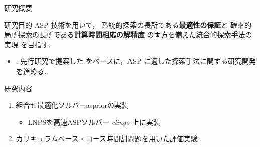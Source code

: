 \documentclass[11pt,dvipdfmx]{beamer}
\begin{document}
\begin{frame}{研究概要}
  \begin{alertblock}{研究目的}\centering
    ASP 技術を用いて，
   系統的探索の長所である\alert{\bf 最適性の保証}と
   確率的局所探索の長所である\alert{\bf 計算時間相応の解精度}
   の両方を備えた統合的探索手法の実現
   を目指す.
  \end{alertblock}

  \begin{itemize}
  \item {}:
    先行研究で提案した%
    をベースに，ASP に適した探索手法に関する研究開発を進める．
  \end{itemize}

  \begin{block}{研究内容}
    \begin{enumerate}
    \item 組合せ最適化ソルバーaspriorの実装
     \begin{itemize}
      \item LNPSを高速ASPソルバー \textit{clingo} 上に実装
     \end{itemize}
    \item カリキュラムベース・コース時間割問題を用いた評価実験
    \end{enumerate}
  \end{block}
\end{frame}
\end{document}
